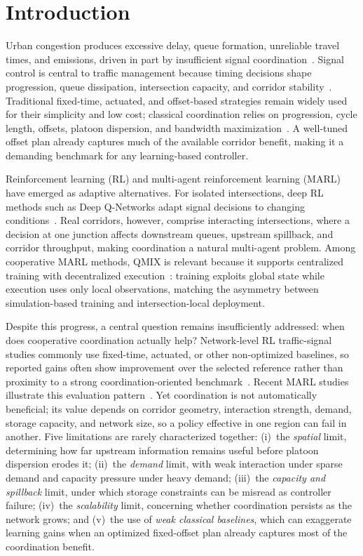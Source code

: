 \documentclass[review,12pt]{elsarticle}
\begin{document}
\section{Introduction}
\label{sec:introduction}

Urban congestion produces excessive delay, queue formation, unreliable travel times, and emissions, driven in part by insufficient signal coordination~\cite{rahman2022,balaci2024}. Signal control is central to traffic management because timing decisions shape progression, queue dissipation, intersection capacity, and corridor stability~\cite{hale2002}. Traditional fixed-time, actuated, and offset-based strategies remain widely used for their simplicity and low cost; classical coordination relies on progression, cycle length, offsets, platoon dispersion, and bandwidth maximization~\cite{paoloserafini1989,jingquanli2014,farzaneh2006}. A well-tuned offset plan already captures much of the available corridor benefit, making it a demanding benchmark for any learning-based controller.

Reinforcement learning (RL) and multi-agent reinforcement learning (MARL) have emerged as adaptive alternatives. For isolated intersections, deep RL methods such as Deep Q-Networks adapt signal decisions to changing conditions~\cite{Mnih2015,jamil2024}. Real corridors, however, comprise interacting intersections, where a decision at one junction affects downstream queues, upstream spillback, and corridor throughput, making coordination a natural multi-agent problem. Among cooperative MARL methods, QMIX is relevant because it supports centralized training with decentralized execution~\cite{Rashid2018}: training exploits global state while execution uses only local observations, matching the asymmetry between simulation-based training and intersection-local deployment.

Despite this progress, a central question remains insufficiently addressed: when does cooperative coordination actually help? Network-level RL traffic-signal studies commonly use fixed-time, actuated, or other non-optimized baselines, so reported gains often show improvement over the selected reference rather than proximity to a strong coordination-oriented benchmark~\cite{noaeen2022reinforcement}. Recent MARL studies illustrate this evaluation pattern~\cite{zhang2022distributed,hu2024,jia2025multi,shang2025graph}. Yet coordination is not automatically beneficial; its value depends on corridor geometry, interaction strength, demand, storage capacity, and network size, so a policy effective in one region can fail in another. Five limitations are rarely characterized together: (i)~the \emph{spatial} limit, determining how far upstream information remains useful before platoon dispersion erodes it; (ii)~the \emph{demand} limit, with weak interaction under sparse demand and capacity pressure under heavy demand; (iii)~the \emph{capacity and spillback} limit, under which storage constraints can be misread as controller failure; (iv)~the \emph{scalability} limit, concerning whether coordination persists as the network grows; and (v)~the use of \emph{weak classical baselines}, which can exaggerate learning gains when an optimized fixed-offset plan already captures most of the coordination benefit.
\end{document}
